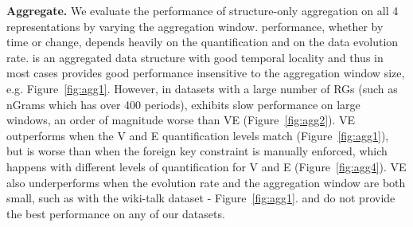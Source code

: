 {\bf Aggregate.}  We evaluate the performance of structure-only
aggregation on all 4 representations by varying the aggregation
window.   performance, whether by time or change,
depends heavily on the quantification and on the data evolution rate.
\og is an aggregated data structure with good temporal locality and
thus in most cases provides good performance insensitive to the
aggregation window size, e.g. Figure~\ref{fig:agg1}.  However, in
datasets with a large number of RGs (such as nGrams which has over 400
periods), \og exhibits slow performance on large windows, an order of
magnitude worse than VE (Figure~\ref{fig:agg2}).  VE outperforms \og
when the V and E quantification levels match (Figure~\ref{fig:agg1}),
but is worse than \og when the foreign key constraint is manually
enforced, which happens with different levels of quantification for V
and E (Figure~\ref{fig:agg4}).  VE also underperforms \og when the
evolution rate and the aggregation window are both small, such as with
the wiki-talk dataset - Figure~\ref{fig:agg1}.  \sg and \hg do not
provide the best performance on any of our datasets.

